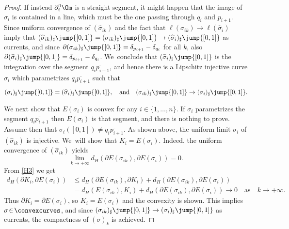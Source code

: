 \begin{proof}
If instead $\partial_i^0\Om$
is a straight segment, it might happen that the image of $\widehat\sigma_i$ is contained in a line, which must be the one passing through $q_i$ and $p_{i+1}$. Since uniform convergence of $(\widehat\sigma_{ik})$ and the fact that $\ell(\sigma_{ik})\to\ell(\widehat\sigma_i)$ imply that $(\widehat\sigma_{ik})_\sharp\jump{[0,1]}=(\sigma_{ik})_\sharp\jump{[0,1]}\to (\widehat\sigma_{i})_\sharp\jump{[0,1]}$ as currents, and since $\partial(\sigma_{ik})_\sharp\jump{[0,1]}=\delta_{p_{i+1}}-\delta_{q_i}$ for all $k$, also $\partial(\widehat\sigma_{i})_\sharp\jump{[0,1]}=\delta_{p_{i+1}}-\delta_{q_i}$. We~conclude that $(\widehat\sigma_{i})_\sharp\jump{[0,1]}$ is the integration over the segment $\overline{q_i p_{i+1}}$, and hence there is a Lipschitz injective curve $\sigma_i$ which parametrizes $\overline{q_i p_{i+1}}$ such that
\[
(\sigma_{i})_\sharp\jump{[0,1]}=(\widehat\sigma_{i})_\sharp\jump{[0,1]},\quad\text{and}\quad
(\sigma_{ik})_\sharp\jump{[0,1]}\to (\sigma_{i})_\sharp\jump{[0,1]}.
\]

We next show that $E(\sigma_i)$
is convex for any $i \in \{1,\dots, n\}$. If $\sigma_i$ parametrizes the segment $\overline{q_i p_{i+1}}$ then $E(\sigma_i)$ is that segment, and there is nothing to prove. Assume then that $\sigma_i([0,1])\neq \overline{q_i p_{i+1}}$. As shown above, the uniform limit $\sigma_i$ of $(\widehat\sigma_{ik})$ is injective. We~will show that $K_i=E(\sigma_i)$. Indeed, the uniform convergence of $(\widehat\sigma_{ik})$ yields
\[
\lim_{k\to+\infty}d_H(\partial E(\sigma_{ik}),\partial E(\sigma_{i}))=0.
\]
From \ref{H3} we get
\begin{align*}
d_H(\partial K_i, \partial E(\sigma_i))&\le d_H(\partial E(\sigma_{ik}),\partial K_i)+ d_H(\partial E(\sigma_{ik}),\partial E(\sigma_{i}))\\
&= d_H( E(\sigma_{ik}),K_i)+ d_H(\partial E(\sigma_{ik}),\partial E(\sigma_{i}))\to0\quad\text{as}\quad k\to+\infty.
\end{align*}
Thus $\partial K_i\!=\!\partial E(\sigma_{i})$, so $K_i\!=\! E(\sigma_{i})$ and the convexity is shown. This implies $\sigma\!\in\! \convexcurves$, and since $(\sigma_{ik})_\sharp\jump{[0,1]}\to (\sigma_{i})_\sharp\jump{[0,1]}$ as currents, the compactness of $(\sigma)_k$ is achieved.


\end{proof}
